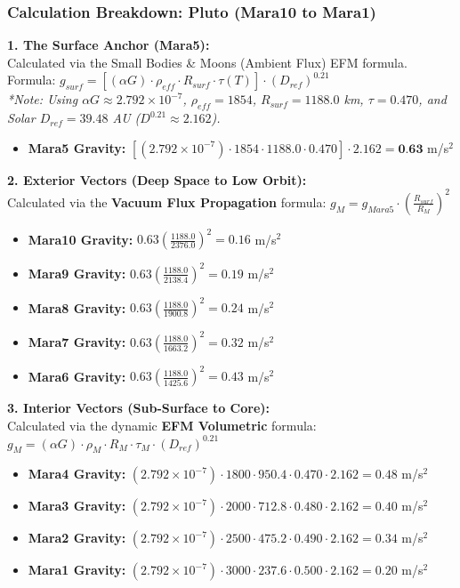 \documentclass[11pt, a4paper]{article}
\begin{document}
\clearpage
\subsubsection{Calculation Breakdown: Pluto (Mara10 to Mara1)}

\noindent \textbf{1. The Surface Anchor (Mara5):} \\
Calculated via the Small Bodies \& Moons (Ambient Flux) EFM formula. \\
Formula: $g_{surf} = \left[ (\alpha G) \cdot \rho_{eff} \cdot R_{surf} \cdot \tau(T) \right] \cdot (D_{ref})^{0.21}$ \\
\textit{*Note: Using $\alpha G \approx 2.792 \times 10^{-7}$, $\rho_{eff} = 1854$, $R_{surf} = 1188.0$ km, $\tau = 0.470$, and Solar $D_{ref} = 39.48$ AU ($D^{0.21} \approx 2.162$).}
\begin{itemize}
  \item \textbf{Mara5 Gravity:} $\left[ (2.792 \times 10^{-7}) \cdot 1854 \cdot 1188.0 \cdot 0.470 \right] \cdot 2.162 = \textbf{0.63}$ m/s$^2$
\end{itemize}

\vspace{0.5em}
\noindent \textbf{2. Exterior Vectors (Deep Space to Low Orbit):} \\
Calculated via the \textbf{Vacuum Flux Propagation} formula: $g_M = g_{Mara5} \cdot \left( \frac{R_{surf}}{R_M} \right)^2$
\begin{itemize}
  \item \textbf{Mara10 Gravity:} $0.63 \left( \frac{1188.0}{2376.0} \right)^2 = 0.16$ m/s$^2$
  \item \textbf{Mara9 Gravity:} $0.63 \left( \frac{1188.0}{2138.4} \right)^2 = 0.19$ m/s$^2$
  \item \textbf{Mara8 Gravity:} $0.63 \left( \frac{1188.0}{1900.8} \right)^2 = 0.24$ m/s$^2$
  \item \textbf{Mara7 Gravity:} $0.63 \left( \frac{1188.0}{1663.2} \right)^2 = 0.32$ m/s$^2$
  \item \textbf{Mara6 Gravity:} $0.63 \left( \frac{1188.0}{1425.6} \right)^2 = 0.43$ m/s$^2$
\end{itemize}

\vspace{0.5em}
\noindent \textbf{3. Interior Vectors (Sub-Surface to Core):} \\
Calculated via the dynamic \textbf{EFM Volumetric} formula: $g_M = (\alpha G) \cdot \rho_{M} \cdot R_M \cdot \tau_M \cdot (D_{ref})^{0.21}$
\begin{itemize}
  \item \textbf{Mara4 Gravity:} $(2.792 \times 10^{-7}) \cdot 1800 \cdot 950.4 \cdot 0.470 \cdot 2.162 = 0.48$ m/s$^2$
  \item \textbf{Mara3 Gravity:} $(2.792 \times 10^{-7}) \cdot 2000 \cdot 712.8 \cdot 0.480 \cdot 2.162 = 0.40$ m/s$^2$
  \item \textbf{Mara2 Gravity:} $(2.792 \times 10^{-7}) \cdot 2500 \cdot 475.2 \cdot 0.490 \cdot 2.162 = 0.34$ m/s$^2$
  \item \textbf{Mara1 Gravity:} $(2.792 \times 10^{-7}) \cdot 3000 \cdot 237.6 \cdot 0.500 \cdot 2.162 = 0.20$ m/s$^2$
\end{itemize}
\end{document}
